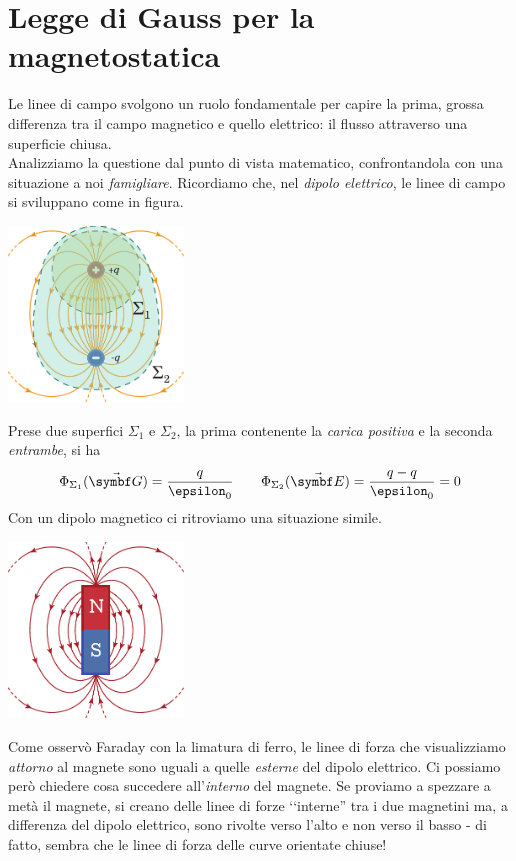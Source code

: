 \section{Legge di Gauss per la magnetostatica}
Le linee di campo svolgono un ruolo fondamentale per capire la prima, grossa differenza tra il campo magnetico e quello elettrico: il flusso attraverso una superficie chiusa.\\
Analizziamo la questione dal punto di vista matematico, confrontandola con una situazione a noi \textit{famigliare}. Ricordiamo che, nel \textit{dipolo elettrico}, le linee di campo si sviluppano come in figura.
\begin{center}
	\includegraphics[width=0.35\textwidth]{images/chp7/chp7leggegaussmagneti1.pdf}
\end{center}
Prese due superfici $\Sigma_1$ e $\Sigma_2$, la prima contenente la \textit{carica positiva} e la seconda \textit{entrambe}, si ha
\begin{equation*}
	\Phi_{\Sigma_1}(\vba{G})=\frac{q}{\epsilon_0}\qquad\Phi_{\Sigma_2}(\vba{E})=\frac{q-q}{\epsilon_0}=0
\end{equation*}
Con un dipolo magnetico ci ritroviamo una situazione simile.
\begin{center}
	\includegraphics[width=0.35\textwidth]{images/chp7/chp7leggegaussmagneti2.pdf}
\end{center}
Come osservò Faraday con la limatura di ferro, le linee di forza che visualizziamo \textit{attorno} al magnete sono uguali a quelle \textit{esterne} del dipolo elettrico. Ci possiamo però chiedere cosa succedere all'\textit{interno} del magnete. Se proviamo a spezzare a metà il magnete, si creano delle linee di forze ‘‘interne'' tra i due magnetini ma, a differenza del dipolo elettrico, sono rivolte verso l'alto e non verso il basso - di fatto, sembra che le linee di forza delle curve orientate chiuse!

